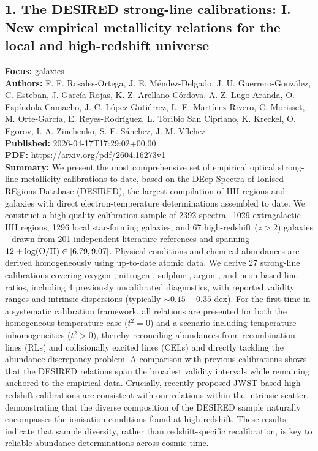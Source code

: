 \documentclass[11pt]{article}
\begin{document}
\subsection*{1. The DESIRED strong-line calibrations: I. New empirical metallicity relations for the local and high-redshift universe}
\textbf{Focus:} galaxies\\
\textbf{Authors:} F. F. Rosales-Ortega, J. E. Méndez-Delgado, J. U. Guerrero-González, C. Esteban, J. García-Rojas, K. Z. Arellano-Córdova, A. Z. Lugo-Aranda, O. Espíndola-Camacho, J. C. López-Gutiérrez, L. E. Martínez-Rivero, C. Morisset, M. Orte-García, E. Reyes-Rodríguez, L. Toribio San Cipriano, K. Kreckel, O. Egorov, I. A. Zinchenko, S. F. Sánchez, J. M. Vílchez\\
\textbf{Published:} 2026-04-17T17:29:02+00:00\\
\textbf{PDF:} \href{https://arxiv.org/pdf/2604.16273v1}{https://arxiv.org/pdf/2604.16273v1}\\
\textbf{Summary:}
We present the most comprehensive set of empirical optical strong-line metallicity calibrations to date, based on the DEep Spectra of Ionised REgions Database (DESIRED), the largest compilation of HII regions and galaxies with direct electron-temperature determinations assembled to date. We construct a high-quality calibration sample of 2392 spectra$-$1029 extragalactic HII regions, 1296 local star-forming galaxies, and 67 high-redshift ($z > 2$) galaxies$-$drawn from 201 independent literature references and spanning $12+\log({\rm O/H}) \in [6.79, 9.07]$. Physical conditions and chemical abundances are derived homogeneously using up-to-date atomic data. We derive 27 strong-line calibrations covering oxygen-, nitrogen-, sulphur-, argon-, and neon-based line ratios, including 4 previously uncalibrated diagnostics, with reported validity ranges and intrinsic dispersions (typically $\sim0.15-0.35$ dex). For the first time in a systematic calibration framework, all relations are presented for both the homogeneous temperature case ($t^2 = 0$) and a scenario including temperature inhomogeneities ($t^2 > 0$), thereby reconciling abundances from recombination lines (RLs) and collisionally excited lines (CELs) and directly tackling the abundance discrepancy problem. A comparison with previous calibrations shows that the DESIRED relations span the broadest validity intervals while remaining anchored to the empirical data. Crucially, recently proposed JWST-based high-redshift calibrations are consistent with our relations within the intrinsic scatter, demonstrating that the diverse composition of the DESIRED sample naturally encompasses the ionisation conditions found at high redshift. These results indicate that sample diversity, rather than redshift-specific recalibration, is key to reliable abundance determinations across cosmic time.
\newpage
\end{document}
